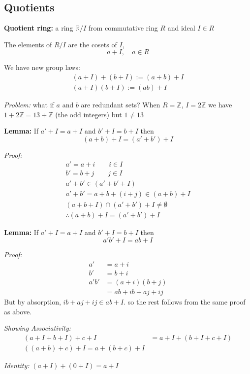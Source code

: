\documentclass[12pt]{report}
\newcommand{\R}{\mathbb{R}}
\newcommand{\Z}{\mathbb{Z}}
\begin{document}
\subsection*{Quotients}
\textbf{Quotient ring:} a ring $\R/I$ from commutative ring $R$ and ideal $I \in R$ 

The elements of $R/I$ are the cosets of $I$,
\[a + I, \quad a \in R\]

We have new group laws:
\begin{align*}
    (a + I) + (b + I) := (a + b) + I\\
    (a + I)(b + I) := (ab) + I
\end{align*}

\emph{Problem:} what if $a$ and $b$ are redundant sets? When $R = \Z$, $I = 2\Z$ we have $1 + 2\Z = 13 + \Z$ (the odd integers) but $1 \neq 13$

\textbf{Lemma:} If $a' +I = a+ I$ and $b' + I = b + I$ then 
\[(a + b) + I = (a' + b') + I\]

\emph{Proof:}
\begin{align*}
    a' = a+ i \qquad i \in I\\
    b' = b +j \qquad j \in I\\
    a' + b' \in (a' + b' + I)\\
    a' + b' = a + b + (i + j) \in (a + b) + I\\
    (a + b + I) \cap (a' + b') + I \neq \emptyset\\
    \therefore (a + b) + I = (a' + b') + I 
\end{align*}

\textbf{Lemma:} If $a' +I = a+ I$ and $b' + I = b + I$ then  
\[a' b' + I = ab + I\]

\emph{Proof:} 
\begin{align*}
    a' &= a + i \\
    b' &= b + i\\
    a'b' &= (a + i)(b+j)\\
    &= ab + ib + aj + ij
\end{align*}
But by absorption, $ib + aj + ij \in ab + I$. so the rest follows from the same proof as above. 

\emph{Showing Associativity:} 
\begin{align*}
    (a + I + b + I) + c + I &= a + I + (b + I + c + I)\\
    ((a + b) + c) + I = a + (b + c) + I
\end{align*}

\emph{Identity:} $(a + I) + (0 + I) = a + I$
\end{document}
